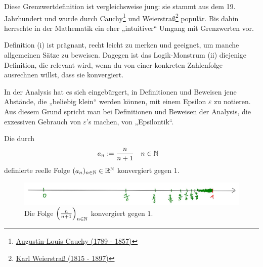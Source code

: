 \begin{bem} 
    Diese Grenzwertdefinition ist vergleichsweise jung: sie stammt aus dem 19. Jahrhundert und wurde durch Cauchy\footnote{\href{https://de.wikipedia.org/wiki/Augustin-Louis_Cauchy}{Augustin-Louis Cauchy (1789 - 1857)}} und Weierstraß\footnote{\href{https://de.wikipedia.org/wiki/Karl_Weierstra\%C3\%9F}{Karl Weierstraß (1815 - 1897)}} populär. Bis dahin herrschte in der Mathematik ein eher „intuitiver“ Umgang mit Grenzwerten vor.
    
    Definition (i) ist prägnant, recht leicht zu merken und geeignet, um manche allgemeinen Sätze zu beweisen. Dagegen ist das Logik-Monstrum (ii) diejenige Definition, die relevant wird, wenn du von einer konkreten Zahlenfolge ausrechnen willst, dass sie konvergiert.
    
    In der Analysis hat es sich eingebürgert, in Definitionen und Beweisen jene Abstände, die „beliebig klein“ werden können, mit einem Epsilon $\varepsilon$ zu notieren. Aus diesem Grund spricht man bei Definitionen und Beweisen der Analysis, die exzessiven Gebrauch von $\varepsilon$'s machen, von „Epsilontik“.
\end{bem}


\begin{bsp} \label{bsp:konvergenz}
    Die durch
    \begin{align*}
        a_n &:= \frac{n}{n+1} && n\in \mathbb N
    \end{align*}
    definierte reelle Folge $(a_n)_{n\in \mathbb N}\in \mathbb R^\mathbb N$ konvergiert gegen $1$.
\end{bsp}


\begin{figure}[ht]
    \includegraphics[width=14cm]{./_img/Konvergenzbsp.jpeg}
    \centering \caption{Die Folge $\left(\frac{n}{n+1}\right)_{n\in \mathbb N}$ konvergiert gegen $1$.}
\end{figure}


